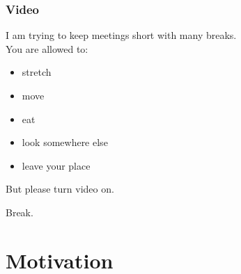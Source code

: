 \begin{assignment}
	\frametitle{Video}
	I am trying to keep meetings short with many breaks. \\
	You are allowed to:
	\begin{itemize}
		\item stretch
		\item move
		\item eat
		\item look somewhere else
		\item leave your place
	\end{itemize}
	\begin{task}
	But please turn video on.
	\end{task}
\end{assignment}

\begin{assignment}
	\begin{task}
	Break.
	\end{task}
\end{assignment}

\section{Motivation}
